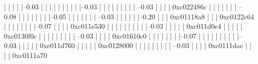             |          |          |                     |          |--0.03%
            |          |          |                     |          |          
            |          |          |                     |          |--0.03%
            |          |          |                     |          |          
            |          |          |                     |           --0.03%
            |          |          |                     |                     0xc022486c
            |          |          |                     |          
            |          |          |                      --0.08%
            |          |          |                                |          
            |          |          |                                |--0.05%
            |          |          |                                |          
            |          |          |                                 --0.03%
            |          |          |          
            |          |          |--0.20%
            |          |          |          0xc01118a8
            |          |          |          0xc0122c64
            |          |          |          |          
            |          |          |          |--0.07%
            |          |          |          |          0xc011e530
            |          |          |          |          |          
            |          |          |          |          |--0.03%
            |          |          |          |          |          0xc011d0e4
            |          |          |          |          |          0xc0130f0c
            |          |          |          |          |          
            |          |          |          |           --0.03%
            |          |          |          |                     0xc01610c0
            |          |          |          |          
            |          |          |          |--0.07%
            |          |          |          |          |          
            |          |          |          |          |--0.03%
            |          |          |          |          |          0xc011d760
            |          |          |          |          |          0xc0128000
            |          |          |          |          |          
            |          |          |          |           --0.03%
            |          |          |          |                     0xc0111dac
            |          |          |          |                     0xc0111a70
